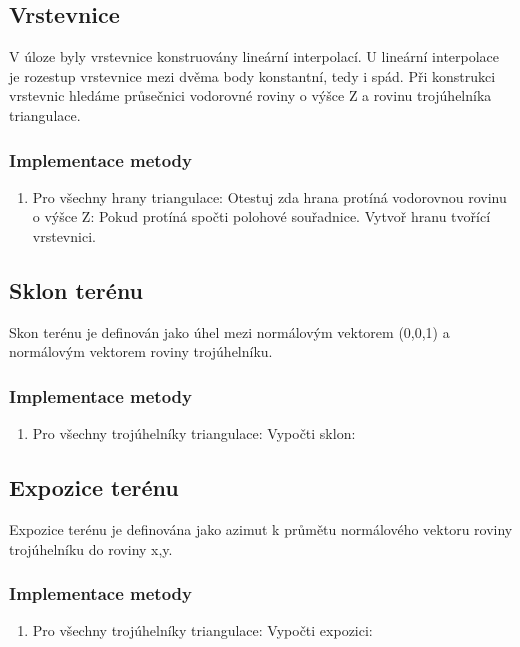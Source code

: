 \documentclass[a4paper, 12pt]{article}
\begin{document}
\subsection{Vrstevnice}
V úloze byly vrstevnice konstruovány lineární interpolací. U lineární interpolace je rozestup vrstevnice mezi dvěma body konstantní, tedy i spád. Při konstrukci vrstevnic hledáme průsečnici vodorovné roviny o výšce Z a rovinu trojúhelníka triangulace.\\

\subsubsection{Implementace metody}
\begin{enumerate}
\item Pro všechny hrany triangulace:
\subitem Otestuj zda hrana protíná vodorovnou rovinu o výšce Z:
\subitem Pokud protíná spočti polohové souřadnice.
\subitem Vytvoř hranu tvořící vrstevnici.

\end{enumerate}

\subsection{Sklon terénu}
Skon terénu je definován jako úhel mezi normálovým vektorem (0,0,1) a normálovým vektorem roviny trojúhelníku.

\subsubsection{Implementace metody}
\begin{enumerate}
\item Pro všechny trojúhelníky triangulace:
\subitem Vypočti sklon:
\end{enumerate}

\subsection{Expozice terénu}
Expozice terénu je definována jako azimut k průmětu normálového vektoru roviny trojúhelníku do roviny x,y.

\subsubsection{Implementace metody}
\begin{enumerate}
\item Pro všechny trojúhelníky triangulace:
\subitem Vypočti expozici:
\end{enumerate}
\end{document}
